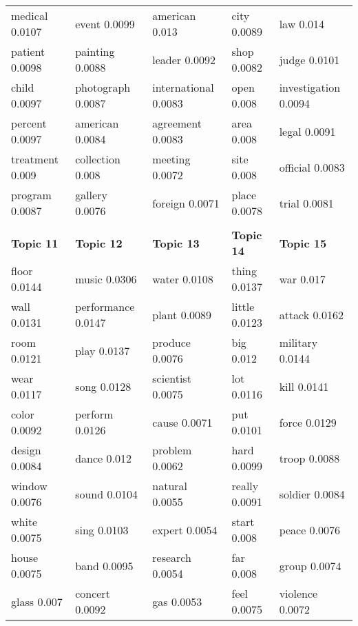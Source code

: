 \documentclass[11pt]{report}
\begin{document}
\begin{table}[!hbt]
\begin{tabular}{| l | l | l |l|l|}
                                   medical 0.0107 & event 0.0099 & american 0.013 & city 0.0089 & law 0.014 \\
                              patient 0.0098 & painting 0.0088 & leader 0.0092 & shop 0.0082 & judge 0.0101 \\
                child 0.0097 & photograph 0.0087 & international 0.0083 & open 0.008 & investigation 0.0094 \\
                            percent 0.0097 & american 0.0084 & agreement 0.0083 & area 0.008 & legal 0.0091 \\
                         treatment 0.009 & collection 0.008 & meeting 0.0072 & site 0.008 & official 0.0083 \\
                             program 0.0087 & gallery 0.0076 & foreign 0.0071 & place 0.0078 & trial 0.0081 \\
                                                                                                &  &  &  &  \\
 \toprule \textbf{Topic 11} & \textbf{Topic 12} & \textbf{Topic 13} & \textbf{Topic 14} & \textbf{Topic 15} \\
                             \midrule floor 0.0144 & music 0.0306 & water 0.0108 & thing 0.0137 & war 0.017 \\
                            wall 0.0131 & performance 0.0147 & plant 0.0089 & little 0.0123 & attack 0.0162 \\
                                   room 0.0121 & play 0.0137 & produce 0.0076 & big 0.012 & military 0.0144 \\
                                    wear 0.0117 & song 0.0128 & scientist 0.0075 & lot 0.0116 & kill 0.0141 \\
                                   color 0.0092 & perform 0.0126 & cause 0.0071 & put 0.0101 & force 0.0129 \\
                                  design 0.0084 & dance 0.012 & problem 0.0062 & hard 0.0099 & troop 0.0088 \\
                             window 0.0076 & sound 0.0104 & natural 0.0055 & really 0.0091 & soldier 0.0084 \\
                                    white 0.0075 & sing 0.0103 & expert 0.0054 & start 0.008 & peace 0.0076 \\
                                    house 0.0075 & band 0.0095 & research 0.0054 & far 0.008 & group 0.0074 \\
                                  glass 0.007 & concert 0.0092 & gas 0.0053 & feel 0.0075 & violence 0.0072 \\

\end{tabular}
\end{table}
\end{document}
